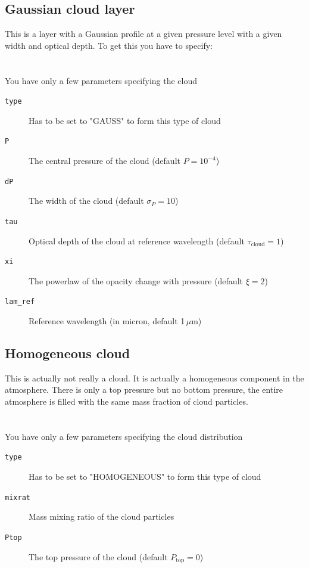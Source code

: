\documentclass[12pt]{article}
\begin{document}
\subsection{Gaussian cloud layer}

This is a layer with a Gaussian profile at a given pressure level with a given width and optical depth. To get this you have to specify:
\\
\\
\\
You have only a few parameters specifying the cloud

\begin{description}
\item[\texttt{type}]
Has to be set to "GAUSS" to form this type of cloud
\item[\texttt{P}]
The central pressure of the cloud (default $P=10^{-4}$)
\item[\texttt{dP}]
The width of the cloud (default $\sigma_P=10$)
\item[\texttt{tau}]
Optical depth of the cloud at reference wavelength (default $\tau_\mathrm{cloud}=1$)
\item[\texttt{xi}]
The powerlaw of the opacity change with pressure (default $\xi=2$)
\item[\texttt{lam\_ref}]
Reference wavelength (in micron, default 1\,$\mu$m)
\end{description}

\subsection{Homogeneous cloud}

This is actually not really a cloud. It is actually a homogeneous component in the atmosphere. There is only a top pressure but no bottom pressure, the entire atmosphere is filled with the same mass fraction of cloud particles.
\\
\\
\\
You have only a few parameters specifying the cloud distribution

\begin{description}
\item[\texttt{type}]
Has to be set to "HOMOGENEOUS" to form this type of cloud
\item[\texttt{mixrat}]
Mass mixing ratio of the cloud particles
\item[\texttt{Ptop}]
The top pressure of the cloud (default $P_\mathrm{top}=0$)
\end{description}
\end{document}
